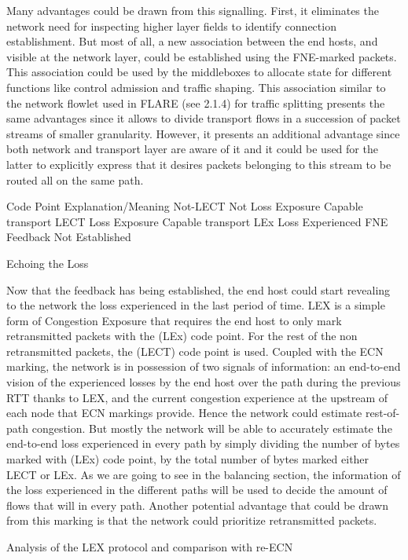 Many advantages could be drawn from this signalling. First, it eliminates the network need for inspecting higher layer fields to identify connection establishment. But most of all, a new  association between the end hosts, and visible at the network layer, could be established using the FNE-marked packets. This association could be used by the middleboxes to allocate state for different functions like control admission and traffic shaping. This association similar to the network flowlet used in FLARE (see 2.1.4) for traffic splitting presents the same advantages since it allows to divide transport flows in a succession of packet streams of smaller granularity. However, it presents an additional advantage since both network and transport layer are aware of it and it could be used for the latter to explicitly express that it desires packets belonging to this stream to be routed all on the same path.

Code Point
Explanation/Meaning
Not-LECT
Not Loss Exposure Capable transport
LECT
Loss Exposure Capable transport
LEx
Loss Experienced
FNE
Feedback Not Established

Echoing the Loss

Now that the feedback has being established, the end host could start revealing to the network the loss experienced in the last period of time. LEX is a simple form of Congestion Exposure that requires the end host to only mark retransmitted packets with the (LEx) code point. For the rest of the non retransmitted packets, the (LECT) code point is used. Coupled with the ECN marking, the network is in possession of two signals of information: an end-to-end vision of the experienced losses by the end host over the path during the previous RTT thanks to LEX, and the  current congestion experience at the upstream of each node that ECN markings provide. Hence the network could estimate rest-of-path congestion. But mostly the network will be able to accurately estimate the end-to-end loss experienced in every path by simply dividing the number of bytes marked with (LEx) code point,  by the total number of bytes marked either LECT or LEx. As we are going to see in the balancing section, the information of the loss experienced in the different paths will be used to decide the amount of flows that will in every path. Another potential advantage that could be drawn from this marking is that the network could prioritize retransmitted packets.

Analysis of the LEX protocol and comparison with re-ECN

